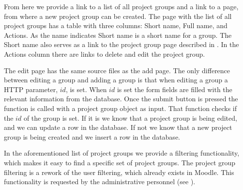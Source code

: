From here we provide a link to a list of all project groups and a link to a page, from where a new project group can be created.
The page with the list of all project groups has a table with three columns: Short name, Full name, and Actions.
As the name indicates Short name is a short name for a group. 
The Short name also serves as a link to the project group page described in .
In the Actions column there are links to delete and edit the project group.

The edit page has the same source files as the add page.
The only difference between editing a group and adding a group is that when editing a group a HTTP parameter, $id$, is set.
When $id$ is set the form fields are filled with the relevant information from the database.
Once the submit button is pressed the function  is called with a project group object as input.
That function checks if the $id$ of the group is set. 
If it is we know that a project group is being edited, and we can update a row in the database.
If not we know that a new project group is being created and we insert a row in the database.

In the aforementioned list of project groups we provide a filtering functionality, which makes it easy to find a specific set of project groups.
The project group filtering is a rework of the user filtering, which already exists in Moodle.
This functionality is requested by the administrative personnel (see ).

